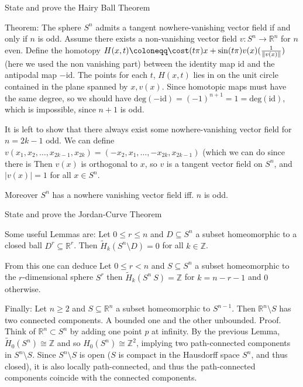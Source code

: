 State and prove the Hairy Ball Theorem

Theorem: The sphere \(S^n\) admits a tangent nowhere-vanishing vector field if and only if \(n\) is odd.
Assume there exists a non-vanishing vector field \( v : S^n \to \mathbb{R}^n \) for \( n \) even.
Define the homotopy \( H(x, t) \coloneqq \cost(t\pi)x + \sin(t\pi)v(x)(\frac{1}{\|v(x)\|}) \) 
(here we used the non vanishing part) between the identity map \( \text{id} \) 
and the antipodal map \( - \text{id} \). The points for each \( t \), \( H(x, t) \)
lies in on the unit circle contained in the plane spanned by \( x, v(x) \). 
Since homotopic maps must have the same degree, so we should have 
\( \text{deg}(-\text{id}) = (-1)^{n+1} = 1 = \text{deg}(\text{id}) \), which is impossible, since \( n+1 \) is odd.


It is left to show that there always exist some nowhere-vanishing vector field for \( n = 2k - 1 \) odd.
We can define \(v(x_1, x_2, \dots, x_{2k-1}, x_{2k}) = (-x_2, x_1, \dots, -x_{2k}, x_{2k-1})\) (which we can do since there is 
Then \(v(x)\) is orthogonal to \(x\), so \(v\) is a tangent vector field on \(S^n\), and \(|v(x)| = 1\) for all \(x \in S^n\). 


Moreover \( S^n \) has a nowhere vanishing vector field iff. \( n \) is odd.

State and prove the Jordan-Curve Theorem

Some useful Lemmas are:
Let \( 0 \leq r \leq n \) and \( D \subseteq S^n \) a subset homeomorphic to a closed ball \( D^r \subseteq \mathbb{R}^r \).
Then \( \tilde{H}_k(S^n\setminus D) = 0 \) for all \( k \in \mathbb{Z} \).

From this one can deduce
Let \( 0 \leq r < n \) and \( S \subseteq S^n \) a subset homeomorphic to the \( r \)-dimensional sphere \( S^r \)
then \( \tilde{H}_k(S^n \ S) = \mathbb{Z} \) for \( k = n - r - 1 \) and \( 0 \) otherwise.

Finally:
Let \( n \geq 2 \) and \( S \subseteq \mathbb{R}^n \) a subset homeomorphic to \( S^{n-1} \).
Then \( \mathbb{R}^n \setminus S \) has two connected components. A bounded one and the other unbounded.
Proof. 
Think of \(\mathbb{R}^n \subset S^n\) by adding one point \(p\) at infinity. By the previous Lemma, \(\tilde{H}_0(S^n) \cong \mathbb{Z}\) 
and so \(H_0(S^n) \cong \mathbb{Z}^2\), implying two path-connected components in \(S^n \setminus S\).
Since \(S^n \setminus S\) is open (\(S\) is compact in the Hausdorff space \(S^n\), and thus closed), 
it is also locally path-connected, and thus the path-connected components coincide with the connected components.


